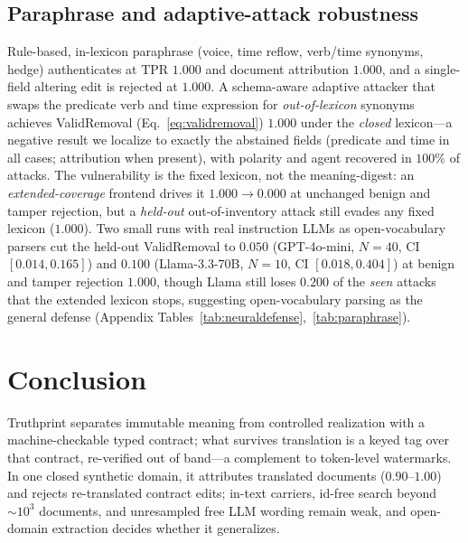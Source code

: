 \documentclass[journal]{IEEEtran}
\begin{document}
\subsection{Paraphrase and adaptive-attack robustness}
\label{sec:paraphrase}
Rule-based, in-lexicon paraphrase (voice, time reflow, verb/time synonyms, hedge) authenticates at TPR $1.000$ and document attribution $1.000$, and a single-field altering edit is rejected at $1.000$. A schema-aware adaptive attacker that swaps the predicate verb and time expression for \emph{out-of-lexicon} synonyms achieves ValidRemoval (Eq.~\eqref{eq:validremoval}) $1.000$ under the \emph{closed} lexicon---a negative result we localize to exactly the abstained fields (predicate and time in all cases; attribution when present), with polarity and agent recovered in $100\%$ of attacks. The vulnerability is the fixed lexicon, not the meaning-digest: an \emph{extended-coverage} frontend drives it $1.000\!\to\!0.000$ at unchanged benign and tamper rejection, but a \emph{held-out} out-of-inventory attack still evades any fixed lexicon ($1.000$). Two small runs with real instruction LLMs as open-vocabulary parsers cut the held-out ValidRemoval to $0.050$ (GPT-4o-mini, $N{=}40$, CI $[0.014,0.165]$) and $0.100$ (Llama-3.3-70B, $N{=}10$, CI $[0.018,0.404]$) at benign and tamper rejection $1.000$, though Llama still loses $0.200$ of the \emph{seen} attacks that the extended lexicon stops, suggesting open-vocabulary parsing as the general defense (Appendix Tables~\ref{tab:neuraldefense},~\ref{tab:paraphrase}).

\section{Conclusion}
Truthprint separates immutable meaning from controlled realization with a machine-checkable typed contract; what survives translation is a keyed tag over that contract, re-verified out of band---a complement to token-level watermarks. In one closed synthetic domain, it attributes translated documents ($0.90$--$1.00$) and rejects re-translated contract edits; in-text carriers, id-free search beyond ${\sim}10^3$ documents, and unresampled free LLM wording remain weak, and open-domain extraction decides whether it generalizes.
\end{document}
